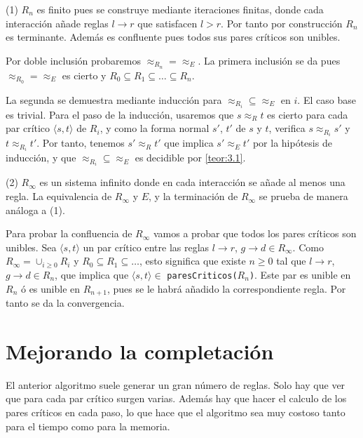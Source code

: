 \begin{demo}
  (1) $R_n$ es finito pues se construye mediante iteraciones finitas,
  donde cada interacción añade reglas $l \rightarrow r$ que satisfacen
  $l > r$. Por tanto por construcción $R_n$ es terminante. Además es
  confluente pues todos sus pares críticos son unibles.

  Por doble inclusión probaremos $\approx_{R_n} = \approx_E$.  La
  primera inclusión se da pues $\approx_{R_0} = \approx_E$ es cierto y
  $R_0 \subseteq R_1 \subseteq \dots \subseteq R_n$.

  La segunda se demuestra mediante inducción para
  $\approx_{R_i} \subseteq \approx_E$ en $i$.  El caso base es
  trivial. Para el paso de la inducción, usaremos que $s \approx_R t$
  es cierto para cada par crítico $\langle s, t \rangle$ de $R_i$, y
  como la forma normal $s'$, $t'$ de $s$ y $t$, verifica
  $s \approx_{R_i} s'$ y $t \approx_{R_i} t'$. Por tanto, tenemos
  $s' \approx_R t'$ que implica $s' \approx_E t'$ por la hipótesis de
  inducción, y que $ \approx_{R_i} \subseteq \approx_E$ es decidible
  por \ref{teor:3.1}.

  (2) $R_{\infty }$ es un sistema infinito donde en cada interacción
  se añade al menos una regla. La equivalencia de $R_{\infty }$ y $E$,
  y la terminación de $R_{\infty }$ se prueba de manera análoga a (1).

  Para probar la confluencia de $R_{\infty }$ vamos a probar que todos
  los pares críticos son unibles. Sea $\langle s,t \rangle$ un par
  crítico entre las reglas $l \rightarrow r$,
  $g \rightarrow d \in R_{\infty }$. Como
  $R_{\infty } = \cup_{i \geq 0} R_i$ y
  $R_0 \subseteq R_1 \subseteq \dots$, esto significa que existe
  $n \geq 0$ tal que $l \rightarrow r$, $g \rightarrow d \in R_n$, que
  implica que $\langle s,t \rangle \in$
  \texttt{paresCriticos($R_n$)}. Este par es unible en $R_n$ ó es
  unible en $R_{n+1}$, pues se le habrá añadido la correspondiente
  regla. Por tanto se da la convergencia.
\end{demo}

\section{Mejorando la completación}

El anterior algoritmo suele generar un gran número de reglas. Solo hay
que ver que para cada par crítico surgen varias. Además hay que hacer
el calculo de los pares críticos en cada paso, lo que hace que el algoritmo sea muy costoso tanto para el tiempo como para la memoria.

